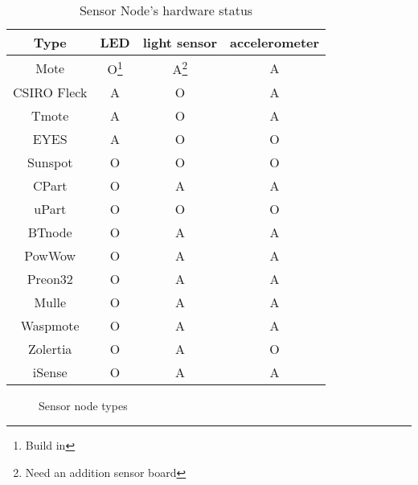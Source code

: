 \begin{table}[htbp]
\caption{Sensor Node's hardware status}
\begin{center}
\begin{minipage}{0.57\linewidth}
\begin{tabular}{|c|c|c|c|}
\hline
Type & LED & light sensor & accelerometer \\
\hline
Mote & O\footnote{Build in} & A\footnote{Need an addition sensor board} & A \\
\hline
CSIRO Fleck& A & O & A\\
\hline
Tmote&  A & O & A\\
\hline
EYES& A & O & O\\
\hline
Sunspot& O &O& O \\
\hline
CPart& O &A	& A \\
\hline
uPart& O &O& O \\
\hline
BTnode& O &A& A \\
\hline	
PowWow& O &A& A \\
\hline	
Preon32& O &A& A \\
\hline	
Mulle& O &A& A \\
\hline	
Waspmote& O &A& A \\
\hline	
Zolertia& O &A& O	 \\
\hline	
iSense& O &A& A \\
\hline			
\end{tabular}
\end{minipage}
\end{center}
\label{tab:sensornode_hardware}
\end{table}%

\begin{figure}[htbp]
\begin{center}
\caption{Sensor node types}
\label{fig:sensor_nodes}
\end{center}
\end{figure}

